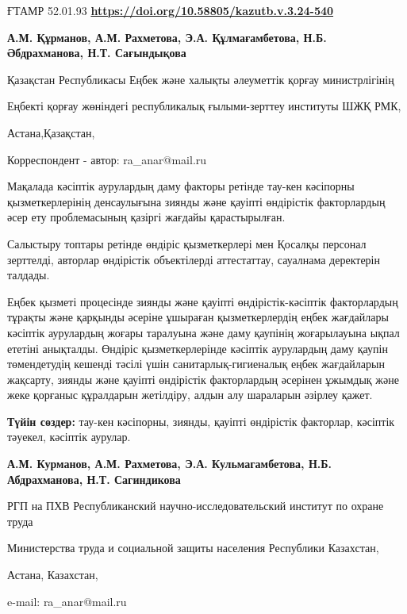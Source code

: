 \newpage
ҒТАМР 52.01.93
\hfill {\bfseries \href{https://doi.org/10.58805/kazutb.v.3.24-540}{https://doi.org/10.58805/kazutb.v.3.24-540}}


\begin{center}
{\bfseries А.М. Құрманов, А.М. Рахметова\envelope, Э.А. Құлмағамбетова, Н.Б. Әбдрахманова, Н.Т. Сағындықова}

Қазақстан Республикасы Еңбек және халықты әлеуметтік қорғау
министрлігінің

Еңбекті қорғау жөніндегі республикалық ғылыми-зерттеу институты ШЖҚ РМК,

Астана,Қазақстан,
\end{center}
\envelope Корреспондент - автор: ra\_anar@mail.ru


Мақалада кәсіптік аурулардың даму факторы ретінде тау-кен кәсіпорны
қызметкерлерінің денсаулығына зиянды және қауіпті өндірістік
факторлардың әсер ету проблемасының қазіргі жағдайы қарастырылған.

Салыстыру топтары ретінде өндіріс қызметкерлері мен Қосалқы персонал
зерттелді, авторлар өндірістік объектілерді аттестаттау, сауалнама
деректерін талдады.

Еңбек қызметі процесінде зиянды және қауіпті өндірістік-кәсіптік
факторлардың тұрақты және қарқынды әсеріне ұшыраған қызметкерлердің
еңбек жағдайлары кәсіптік аурулардың жоғары таралуына және даму қаупінің
жоғарылауына ықпал ететіні анықталды. Өндіріс қызметкерлерінде кәсіптік
аурулардың даму қаупін төмендетудің кешенді тәсілі үшін
санитарлық-гигиеналық еңбек жағдайларын жақсарту, зиянды және қауіпті
өндірістік факторлардың әсерінен ұжымдық және жеке қорғаныс құралдарын
жетілдіру, алдын алу шараларын әзірлеу қажет.

{\bfseries Түйін сөздер:} тау-кен кәсіпорны, зиянды, қауіпті өндірістік
факторлар, кәсіптік тәуекел, кәсіптік аурулар.


\begin{center}
{\bfseries А.М. Курманов, А.М. Рахметова\envelope, Э.А. Кульмагамбетова, Н.Б. Абдрахманова, Н.Т. Сагиндикова}

РГП на ПХВ Республиканский научно-исследовательский институт по охране
труда

Министерства труда и социальной защиты населения Республики Казахстан,

Астана, Казахстан,

e-mail: ra\_anar@mail.ru
\end{center}

